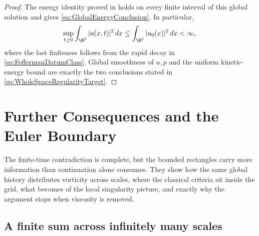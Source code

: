 \begin{proof}
The energy identity proved in  holds on every finite
interval of this global solution and gives \eqref{eq:GlobalEnergyConclusion}.
In particular,
\[
  \sup_{t\geq0}\int_{\R^3}|u(x,t)|^2\,dx
  \leq
  \int_{\R^3}|u_0(x)|^2\,dx
  <\infty,
\]
where the last finiteness follows from the rapid decay in
\eqref{eq:FeffermanDatumClass}.  Global smoothness of \(u,p\) and the
uniform kinetic-energy bound are exactly the two conclusions stated in
\eqref{eq:WholeSpaceRegularityTarget}.
\end{proof}

\section{Further Consequences and the Euler Boundary}\label{sec:FurtherConsequencesAndEulerBoundary}

The finite-time contradiction is complete, but the bounded rectangles carry more information than continuation alone consumes.
They show how the same global history distributes vorticity across scales, where the classical criteria sit inside the grid, what becomes of the local singularity picture, and exactly why the argument stops when viscosity is removed.

\subsection{A finite sum across infinitely many scales}\label{sub:AFiniteSumAcrossScales}

